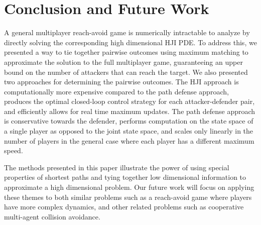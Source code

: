 \section{Conclusion and Future Work}
\label{sec:conclusion}
A general multiplayer reach-avoid game is numerically intractable to analyze by directly solving the corresponding high dimensional HJI PDE. To address this, we presented a way to tie together pairwise outcomes using maximum matching to approximate the solution to the full multiplayer game, guaranteeing an upper bound on the number of attackers that can reach the target. We also presented two approaches for determining the pairwise outcomes. The HJI approach is computationally more expensive compared to the path defense approach, produces the optimal closed-loop control strategy for each attacker-defender pair, and efficiently allows for real time maximum updates. The path defense approach is conservative towards the defender, performs computation on the state space of a single player as opposed to the joint state space, and scales only linearly in the number of players in the general case where each player has a different maximum speed.

The methods presented in this paper illustrate the power of using special properties of shortest paths and tying together low dimensional information to approximate a high dimensional problem. Our future work will focus on applying these themes to both similar problems such as a reach-avoid game where players have more complex dynamics, and other related problems such as cooperative multi-agent collision avoidance.